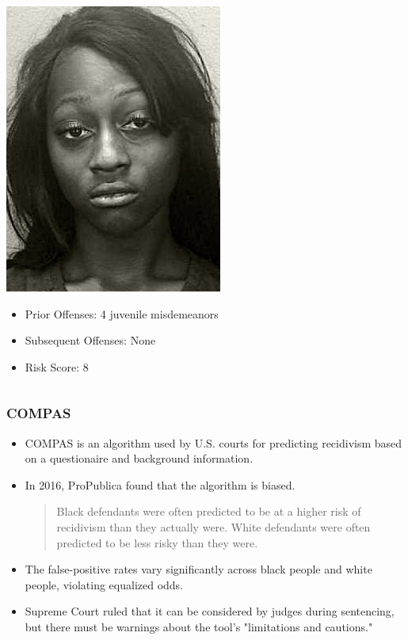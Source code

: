 \documentclass{beamer}
\begin{document}
\begin{frame}
\begin{columns}[T]
\begin{column}{.5\textwidth}
            \centering
            \includegraphics[width=.5\textwidth]{BORDEN.jpg}
            \footnotesize
            \begin{itemize}
                \item Prior Offenses: 4 juvenile misdemeanors
                \item Subsequent Offenses: None
                \item Risk Score: 8
            \end{itemize}
        \end{column}
    \end{columns}
\end{frame}

\begin{frame}
    \frametitle{COMPAS}
    \begin{itemize}
        \item COMPAS is an algorithm
        used by U.S. courts for predicting recidivism based on a
        questionaire and background information.
        \item In 2016, ProPublica found that the algorithm is biased.
        \begin{quote}
            Black defendants were often predicted to be at a higher risk of recidivism than they actually were.
            White defendants were often predicted to be less risky than they were.
        \end{quote}
        \item The false-positive rates vary significantly across
        black people and white people, violating equalized odds.
        \item Supreme Court ruled that it can be considered by judges during
        sentencing, but there must be warnings about the tool's "limitations and cautions."
    \end{itemize}
\end{frame}
\end{document}
